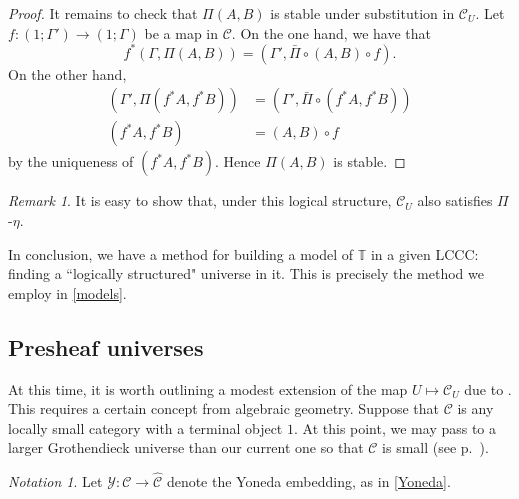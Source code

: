\documentclass[10pt,letterpaper,cm]{nupset}
\theoremstyle{definition}
\theoremstyle{theorem}
\theoremstyle{remark}
\newtheorem{remark}[definition]{Remark}
\newtheorem*{notation}{Notation}
\newcommand{\0}{\mathbf{0}}
\newcommand{\1}{\mathbf{1}}
\newcommand{\2}{\mathbf{2}}
\renewcommand{\c}{\mathscr{C}}
\newcommand{\T}{\mathbb T}
\begin{document}
\begin{proof}
It remains to check that $\Pi(A,B)$  is stable under substitution in $\c_U$. Let $f: \left(1; \Gamma'\right) \to \left(1; \Gamma\right)$ be a map in $\c$. On the one hand, we have that $$f^{\ast}(\Gamma, \Pi(A, B)) = \left(\Gamma', \bar{\Pi} \circ  \left(A, B\right) \circ f\right).$$ On the other hand, 
\begin{align*}
\left(\Gamma', \Pi(f^{\ast}{A}, f^{\ast}{B})\right) & = \left(\Gamma', \bar{\Pi}\circ \left(f^{\ast}{A},f^{\ast}{B}\right) \right)
\\ \left(f^{\ast}{A},f^{\ast}{B}\right)& =  \left(A, B\right) \circ f 
\end{align*}
by the uniqueness of $\left(f^{\ast}{A},f^{\ast}{B}\right)$. Hence $\Pi(A,B)$ is stable.
\end{proof}

\begin{remark}
It is easy to show that, under this logical structure, $\c_U$ also satisfies $\Pi$-$\eta$.
\end{remark}

\medskip

In conclusion, we have a method for building a model of $\T$ in a given LCCC: finding a ``logically structured" universe in it. This is precisely the method we employ in \cref{models}.


\subsection{Presheaf universes}\label{PrUn}

At this time, it is worth outlining a modest extension of the map $U \mapsto \c_{U}$ due to \cite{Nat}. This requires a certain concept from algebraic geometry. Suppose that $\c$ is any locally small category with a terminal object $1$. At this point, we may pass to a larger Grothendieck universe than our current one so that $\c$ is small (see p.~\pageref{ssetsmall}).

\begin{notation}
Let $\mathcal{Y}: \c \to \widehat{\c}$ denote the Yoneda embedding, as in \cref{Yoneda}.
\end{notation}
\end{document}
